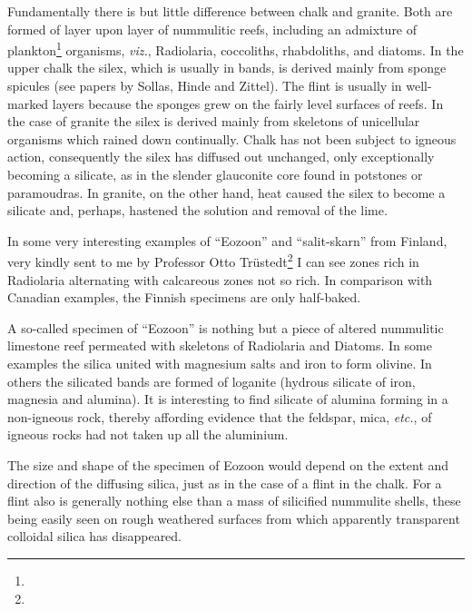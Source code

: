 \documentclass[a4paper, 12pt, oneside]{article}
\begin{document}
Fundamentally there is but little difference between chalk and granite. Both are formed of layer upon layer of nummulitic reefs, including an admixture of plankton\footnote{} organisms, \emph{viz.}, Radiolaria, coccoliths, rhabdoliths, and diatoms. In the upper chalk the silex, which is usually in bands, is derived mainly from sponge spicules (see papers by Sollas, Hinde and Zittel). The flint is usually in well-marked layers because the sponges grew on the fairly level surfaces of reefs. In the case of granite the silex is derived mainly from skeletons of unicellular organisms which rained down continually. Chalk has not been subject to igneous action, consequently the silex has diffused out unchanged, only exceptionally becoming a silicate, as in the slender glauconite core found in potstones or paramoudras. In granite, on the other hand, heat caused the silex to become a silicate and, perhaps, hastened the solution and removal of the lime.

In some very interesting examples of ``Eozoon'' and ``salit-skarn'' from Finland, very kindly sent to me by Professor Otto Trüstedt\footnote{} I can see zones rich in Radiolaria alternating with calcareous zones not so rich. In comparison with Canadian examples, the Finnish specimens are only half-baked.

A so-called specimen of ``Eozoon'' is nothing but a piece of altered nummulitic limestone reef permeated with skeletons of Radiolaria and Diatoms. In some examples the silica united with magnesium salts and iron to form olivine. In others the silicated bands are formed of loganite (hydrous silicate of iron, magnesia and alumina). It is interesting to find silicate of alumina forming in a non-igneous rock, thereby affording evidence that the feldspar, mica, \emph{etc.}, of igneous rocks had not taken up all the aluminium.

The size and shape of the specimen of Eozoon would depend on the extent and direction of the diffusing silica, just as in the case of a flint in the chalk. For a flint also is generally nothing else than a mass of silicified nummulite shells, these being easily seen on rough weathered surfaces from which apparently transparent colloidal silica has disappeared.
\end{document}
